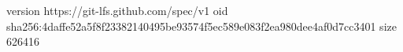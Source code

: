 version https://git-lfs.github.com/spec/v1
oid sha256:4daffe52a5f8f23382140495be93574f5ec589e083f2ea980dee4af0d7cc3401
size 626416
